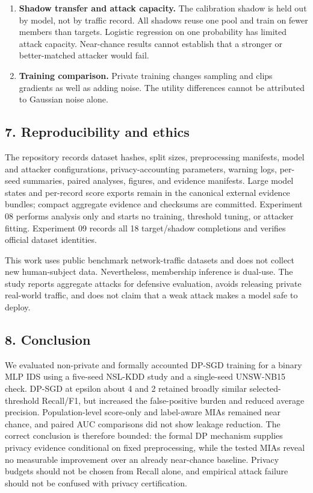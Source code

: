 \documentclass[11pt,a4paper]{article}
\begin{document}
\begin{enumerate}
  \textbf{No adversarial-evasion evaluation.} DP and adversarial
  robustness can interact, but the present experiments do not test
  protocol-valid evasion or poisoning.
\item
  \textbf{Shadow transfer and attack capacity.} The calibration shadow
  is held out by model, not by traffic record. All shadows reuse one
  pool and train on fewer members than targets. Logistic regression on
  one probability has limited attack capacity. Near-chance results
  cannot establish that a stronger or better-matched attacker would
  fail.
\item
  \textbf{Training comparison.} Private training changes sampling and
  clips gradients as well as adding noise. The utility differences
  cannot be attributed to Gaussian noise alone.
\end{enumerate}

\hypertarget{reproducibility-and-ethics}{%
\subsection{7. Reproducibility and
ethics}\label{reproducibility-and-ethics}}

The repository records dataset hashes, split sizes, preprocessing
manifests, model and attacker configurations, privacy-accounting
parameters, warning logs, per-seed summaries, paired analyses, figures,
and evidence manifests. Large model states and per-record score exports
remain in the canonical external evidence bundles; compact aggregate
evidence and checksums are committed. Experiment 08 performs analysis
only and starts no training, threshold tuning, or attacker fitting.
Experiment 09 records all 18 target/shadow completions and verifies
official dataset identities.

This work uses public benchmark network-traffic datasets and does not
collect new human-subject data. Nevertheless, membership inference is
dual-use. The study reports aggregate attacks for defensive evaluation,
avoids releasing private real-world traffic, and does not claim that a
weak attack makes a model safe to deploy.

\hypertarget{conclusion}{%
\subsection{8. Conclusion}\label{conclusion}}

We evaluated non-private and formally accounted DP-SGD training for a
binary MLP IDS using a five-seed NSL-KDD study and a single-seed
UNSW-NB15 check. DP-SGD at epsilon about 4 and 2 retained broadly
similar selected-threshold Recall/F1, but increased the false-positive
burden and reduced average precision. Population-level score-only and
label-aware MIAs remained near chance, and paired AUC comparisons did
not show leakage reduction. The correct conclusion is therefore bounded:
the formal DP mechanism supplies privacy evidence conditional on fixed
preprocessing, while the tested MIAs reveal no measurable improvement
over an already near-chance baseline. Privacy budgets should not be
chosen from Recall alone, and empirical attack failure should not be
confused with privacy certification.
\end{document}

